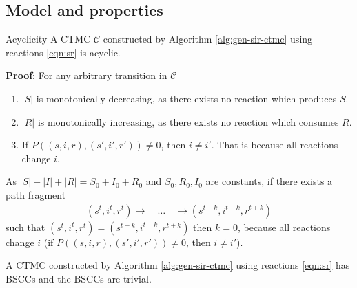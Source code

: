 \subsection{Model and properties}

\begin{theorem}{Acyclicity}
    A CTMC $\mathcal{C}$ constructed by Algorithm \ref{alg:gen-sir-ctmc} using reactions
    \ref{eqn:sr} is acyclic.
\end{theorem}
\textbf{Proof}: For any arbitrary transition in $\mathcal{C}$
\begin{enumerate}
    \item $|S|$ is monotonically decreasing, as there exists no reaction which produces $S$.
    \item $|R|$ is monotonically increasing, as there exists no reaction which consumes $R$.
    \item If $P((s,i,r), (s',i',r'))\neq 0$, then $i \neq i'$. That is because all reactions change $i$.
\end{enumerate}
As $|S| + |I| + |R| = S_0 + I_0 + R_0$ and $S_0,R_0,I_0$ are constants, if there exists a path fragment
\begin{align*}
    (s^t,i^t,r^t)\rightarrow \quad \ldots \quad \rightarrow(s^{t+k},i^{t+k},r^{t+k})
\end{align*}
such that $(s^t,i^t,r^t) = (s^{t+k},i^{t+k},r^{t+k})$ then $k=0$, because all reactions change $i$
(if $P((s,i,r), (s',i',r'))\neq 0$, then $i \neq i'$). \QED
\begin{corollary}
    A CTMC constructed by Algorithm \ref{alg:gen-sir-ctmc} using reactions \ref{eqn:sr} has BSCCs
    and the BSCCs are trivial.
\end{corollary}

